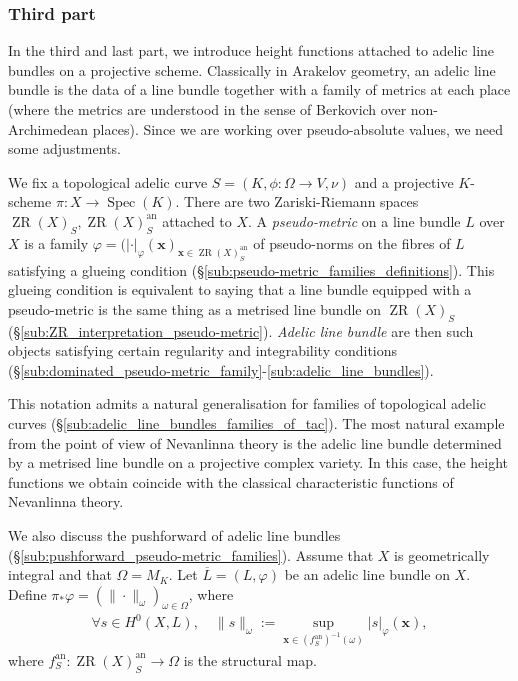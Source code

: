 \documentclass [11pt,reqno]{amsart}
\newcommand{\1}{\mathmybb{1}}
\def\an{\operatorname{an}}
\def\Spec{\operatorname{Spec}}
\def\ZR{\operatorname{ZR}}
\begin{document}
\subsubsection*{Third part}

In the third and last part, we introduce height functions attached to adelic line bundles on a projective scheme. Classically in Arakelov geometry, an adelic line bundle is the data of a line bundle together with a family of metrics at each place (where the metrics are understood in the sense of Berkovich over non-Archimedean places). Since we are working over pseudo-absolute values, we need some adjustments.

We fix a topological adelic curve $S=(K,\phi : \Omega \to V, \nu)$ and a projective $K$-scheme $\pi : X \to \Spec(K)$. There are two Zariski-Riemann spaces $\ZR(X)_{S},\ZR(X)^{\an}_{S}$ attached to $X$. A \emph{pseudo-metric} on a line bundle $L$ over $X$ is a family $\varphi=(|\cdot|_{\varphi}(\mathbf{x})_{\mathbf{x}\in\ZR(X)_{S}^{\an}}$ of pseudo-norms on the fibres of $L$ satisfying a glueing condition (\S \ref{sub:pseudo-metric_families_definitions}). This glueing condition is equivalent to saying that a line bundle equipped with a pseudo-metric is the same thing as a metrised line bundle on $\ZR(X)_{S}$ (\S \ref{sub:ZR_interpretation_pseudo-metric}). \emph{Adelic line bundle} are then such objects satisfying certain regularity and integrability conditions (\S \ref{sub:dominated_pseudo-metric_family}-\ref{sub:adelic_line_bundles}). 

This notation admits a natural generalisation for families of topological adelic curves (\S \ref{sub:adelic_line_bundles_families_of_tac}). The most natural example from the point of view of Nevanlinna theory is the adelic line bundle determined by a metrised line bundle on a projective complex variety. In this case, the height functions we obtain coincide with the classical characteristic functions of Nevanlinna theory.

We also discuss the pushforward of adelic line bundles (\S \ref{sub:pushforward_pseudo-metric_families}). Assume that $X$ is geometrically integral and that $\Omega=M_{K}$. Let $\overline{L}=(L,\varphi)$ be an adelic line bundle on $X$. Define $\pi_{\ast}\varphi=(\|\cdot\|_{\omega})_{\omega\in\Omega}$, where 
\begin{align*}
\forall s\in H^{0}(X,L), \quad \|s\|_{\omega}:=\displaystyle\sup_{\mathbf{x}\in (f_{S}^{\an})^{-1}(\omega)} |s|_{\varphi}(\mathbf{x}),
\end{align*}
where $f_{S}^{\an} : \ZR(X)_{S}^{\an}\to \Omega$ is the structural map. 
\end{document}
